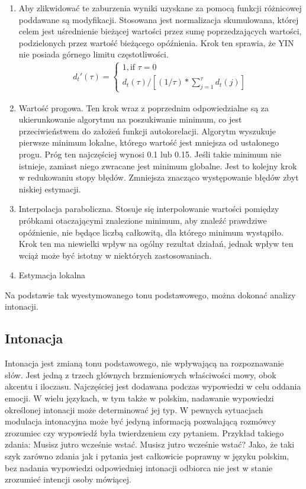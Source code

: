 \documentclass[a4paper,12 pt]{article}
\begin{document}
\begin{enumerate}
\item Aby zlikwidować te zaburzenia wyniki uzyskane za pomocą funkcji różnicowej poddawane są modyfikacji. Stosowana jest normalizacja skumulowana, której celem jest uśrednienie bieżącej wartości przez sumę poprzedzających wartości, podzielonych przez wartość bieżącego opóźnienia. Krok ten sprawia, że YIN nie posiada górnego limitu częstotliwości.
\begin{gather*}
d_{t}'(\tau) =
\begin{cases}
  1,  \text{if }\tau=0 \\
  d_{t}(\tau)/[ (1/\tau) * \sum\limits_{j=1}^{\tau}d_{t}(j)]
\end{cases}
\end{gather*}
\item Wartość progowa. Ten krok wraz z poprzednim odpowiedzialne są za ukierunkowanie algorytmu na poszukiwanie minimum, co jest przeciwieństwem do założeń funkcji autokorelacji. Algorytm wyszukuje pierwsze minimum lokalne, którego wartość jest mniejsza od ustalonego progu. Próg ten najczęściej wynosi 0.1 lub 0.15. Jeśli takie minimum nie istnieje, zamiast niego zwracane jest minimum globalne. Jest to kolejny krok w redukowaniu stopy błędów. Zmniejsza znacząco występowanie błędów zbyt niskiej estymacji.

\item Interpolacja paraboliczna. Stosuje się interpolowanie wartości pomiędzy próbkami otaczającymi znalezione minimum, aby znaleźć prawdziwe opóźnienie, nie będące liczbą całkowitą, dla którego minimum wystąpiło. Krok ten ma niewielki wpływ na ogólny rezultat działań, jednak wpływ ten wciąż może być istotny w niektórych zastosowaniach.
\item Estymacja lokalna
\end{enumerate}
Na podstawie tak wyestymowanego tonu podstawowego, można dokonać analizy intonacji.



\subsection{Intonacja}


Intonacja jest zmianą tonu podstawowego, nie wpływającą na rozpoznawanie słów. Jest jedną z trzech głównych brzmieniowych właściwości mowy, obok akcentu i iloczasu. Najczęściej jest dodawana podczas wypowiedzi w celu oddania emocji. W wielu językach, w tym także w polskim, nadawanie wypowiedzi określonej intonacji może determinować jej typ. W pewnych sytuacjach modulacja intonacyjna może być jedyną informacją pozwalającą rozmówcy zrozumiec czy wypowiedź była twierdzeniem czy pytaniem. 
Przykład takiego zdania:
\newline Musisz jutro wcześnie wstać.
\newline Musisz jutro wcześnie wstać?
\newline Jako, że taki szyk zarówno zdania jak i pytania jest całkowicie poprawny w języku polskim, bez nadania wypowiedzi odpowiedniej intonacji odbiorca nie jest w stanie zrozumieć intencji osoby mówiącej.
\end{document}
